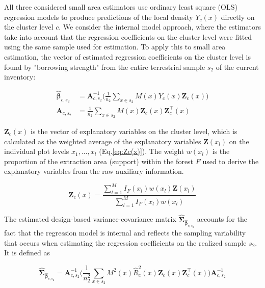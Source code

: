 All three considered small area estimators use ordinary least square (OLS) regression models to produce predictions of the local density $Y_{c}(x)$ directly on the cluster level $c$. We consider the internal model approach, where the estimators take into account that the regression coefficients on the cluster level were fitted using the same sample used for estimation. To apply this to small area estimation, the vector of estimated regression coefficients on the cluster level is found by "borrowing strength" from the entire terrestrial sample $s_2$ of the current inventory:

\begin{subequations}\label{normequ_simple_cluster}
	\begin{align}
	\hat{\pmb{\beta}}_{c,s_2} &= \pmb{A}_{c,s_2}^{-1} \Big(\frac{1}{n_2}\sum_{x\in{s_2}}M(x)Y_{c}(x)\pmb{Z}_{c}(x)\Big) \\
	\pmb{A}_{c,s_2} &=\frac{1}{n_2}\sum_{x\in{s_2}}M(x)\pmb{Z}_{c}(x)\pmb{Z}_{c}^{\top}(x)
	\end{align}
\end{subequations}

\noindent $\pmb{Z}_{c}(x)$ is the vector of explanatory variables on the cluster level, which is calculated as the weighted average of the explanatory variables $\pmb{Z}(x_l)$ on the individual plot levels $x_1, ..., x_l$ (Eq.\ref{eq:Zc(x)}). The weight $w(x_l)$ is the proportion of the extraction area (support) within the forest $F$ used to derive the explanatory variables from the raw auxiliary information.

\begin{equation}\label{eq:Zc(x)}
\pmb{Z}_{c}(x)=\frac{\sum_{l=1}^{M}I_{F}(x_l)w(x_l)\pmb{Z}(x_l)}{\sum_{l=1}^{M}I_{F}(x_l)w(x_l)}
\end{equation}

\noindent The estimated design-based variance-covariance matrix $\hat{\pmb{\Sigma}}_{\hat{\pmb{\beta}}_{c,s_2}}$ accounts for the fact that the regression model is internal and reflects the sampling variability that occurs when estimating the regression coefficients on the realized sample $s_2$. It is defined as

\begin{equation}\label{eq:varcovarbeta}
\hat{\pmb{\Sigma}}_{\hat{\pmb{\beta}}_{c,s_2}}=\pmb{A}_{c,s_2}^{-1}
\Big(\frac{1}{n_2^2}\sum_{x\in{s_2}}M^{2}(x)\hat{R}_{c}^2(x)\pmb{Z}_{c}(x)\pmb{Z}_{c}^{\top}(x)\Big)
\pmb{A}_{c,s_2}^{-1}
\end{equation}

